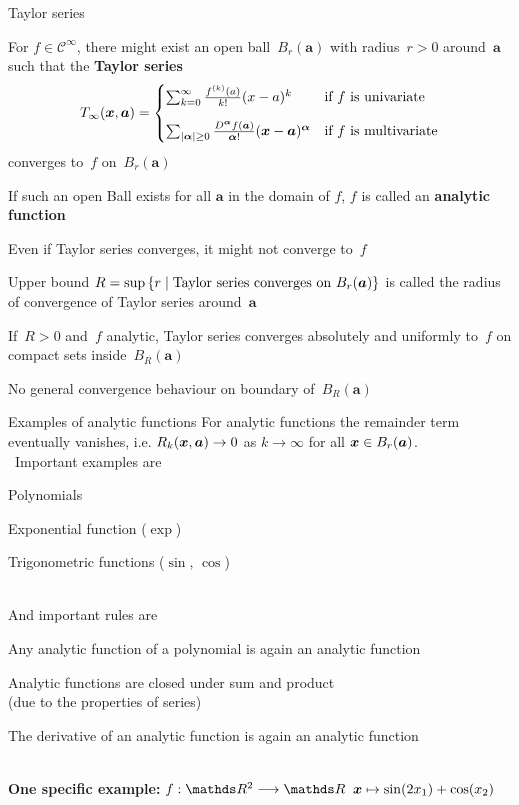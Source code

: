 \documentclass[11pt,compress,t,notes=noshow, xcolor=table]{beamer}
\begin{document}
\begin{framei}{Taylor series}
\item For $f \in \mathcal{C}^\infty$, there might exist an open ball~$B_r(\bm{a})$ with radius~$r>0$ around~$\bm{a}$ such that the \textbf{Taylor series}
$$        
T_\infty(\bm{x},\bm{a})=\begin{cases}
\sum_{k=0}^{\infty} \frac{f^{(k)}(a)}{k!}(x-a)^k&\text{if $f$ is univariate}\\[10pt]
\sum_{|\bm{\alpha}| \geq 0} \frac{D^{\bm{\alpha}} f(\bm{a})}{{\bm{\alpha}}!} (\bm{x} - \bm{a})^{\bm{\alpha}}&\text{if $f$ is multivariate}
\end{cases}
$$
converges to~$f$ on~$B_r(\bm{a})$
\item If such an open Ball exists for all $\bm{a}$ in the domain of $f$, $f$ is called an \textbf{analytic function}
\item Even if Taylor series converges, it might not converge to~$f$
\item Upper bound $R = \sup \left\lbrace r \;|\; \textnormal{Taylor series converges on } B_r(\bm{a}) \right\rbrace$ is called the radius of convergence of Taylor series around~$\bm{a}$
\item If~$R>0$ and~$f$ analytic, Taylor series converges absolutely and uniformly to~$f$ on compact sets inside~$B_R(\bm{a})$
\item No general convergence behaviour on boundary of~$B_R(\bm{a})$
\end{framei}


\begin{framev}{Examples of analytic functions}
For analytic functions the remainder term eventually vanishes, i.e.
$R_k(\bm{x}, \bm{a}) \rightarrow 0$ as $k \rightarrow \infty$ for all $\bm{x} \in B_r(\bm{a})$.\\\,
Important examples are\begin{itemizeM}
\item Polynomials
\item Exponential function ($\exp$)
\item Trigonometric functions ($\sin$, $\cos$)
\end{itemizeM}\,\\
And important rules are \begin{itemizeM}
\item Any analytic function of a polynomial is again an analytic function
\item Analytic functions are closed under sum and product \\(due to the properties of series)
\item The derivative of an analytic function is again an analytic function
\end{itemizeM}\,\\
\textbf{One specific example: } $f:\R^2\longrightarrow \R$ $\bm{x} \mapsto \sin(2x_1) + \cos(x_2)$
\end{framev}
\end{document}

